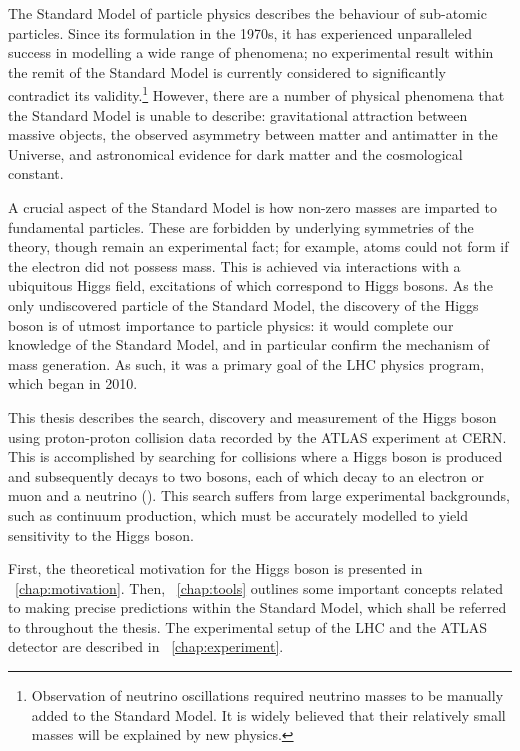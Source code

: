 
The Standard Model of particle physics describes the behaviour of sub-atomic particles. 
Since its formulation in the 1970s, it has experienced unparalleled success in modelling a 
wide range of phenomena; no experimental result within the remit of the Standard Model is 
currently considered to significantly contradict its validity.\footnote{
	Observation of neutrino oscillations required neutrino masses to be manually added to 
	the Standard Model. It is widely believed that their relatively small masses will be 
	explained by new physics.
}
However, there are a number of physical phenomena that the Standard Model is unable to 
describe: gravitational attraction between massive objects, the observed asymmetry between 
matter and antimatter in the Universe, and astronomical evidence for dark matter and the 
cosmological constant.

A crucial aspect of the Standard Model is how non-zero masses are imparted to fundamental 
particles. These are forbidden by underlying symmetries of the theory, though remain an 
experimental fact; for example, atoms could not form if the electron did not possess mass.
This is achieved via interactions with a ubiquitous Higgs field, excitations of which 
correspond to Higgs bosons. As the only undiscovered particle of the Standard Model, the 
discovery of the Higgs boson is of utmost importance to particle physics: it would complete 
our knowledge of the Standard Model, and in particular confirm the mechanism of mass 
generation. As such, it was a primary goal of the LHC physics program, which began in 2010.

This thesis describes the search, discovery and measurement of the Higgs boson using 
proton-proton collision data recorded by the ATLAS experiment at CERN. This is accomplished 
by searching for collisions where a Higgs boson is produced and subsequently decays to two 
\PW bosons, each of which decay to an electron or muon and a neutrino (\ie \HWWlvlv). This 
search suffers from large experimental backgrounds, such as continuum \WW production, which 
must be accurately modelled to yield sensitivity to the Higgs boson.

First, the theoretical motivation for the Higgs boson is presented in 
\Chapter~\ref{chap:motivation}. Then, \Chapter~\ref{chap:tools} outlines some important 
concepts related to making precise predictions within the Standard Model, which shall be 
referred to throughout the thesis. The experimental setup of the LHC and the ATLAS detector 
are described in \Chapter~\ref{chap:experiment}.

